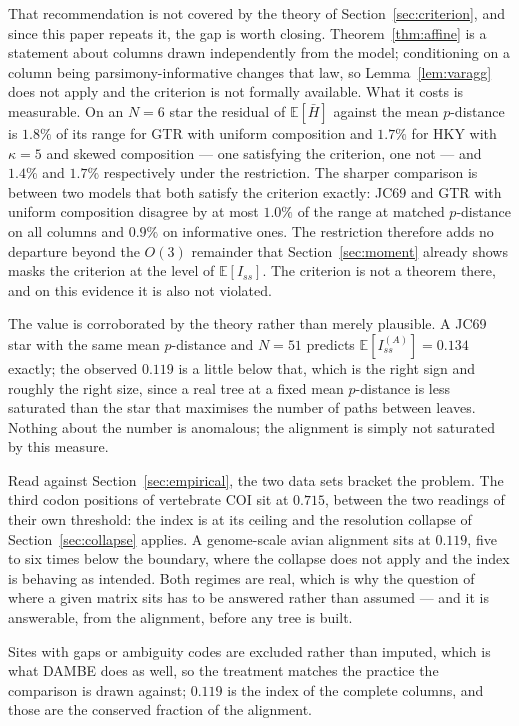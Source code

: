 \documentclass[11pt]{article}
\newcommand{\Iss}{I_{ss}}
\newcommand{\Hbar}{\bar H}
\newcommand{\E}{\mathbb{E}}
\theoremstyle{definition}
\theoremstyle{remark}
\begin{document}
That recommendation is not covered by the theory of
Section~\ref{sec:criterion}, and since this paper repeats it, the gap is
worth closing. Theorem~\ref{thm:affine} is a statement about columns drawn
independently from the model; conditioning on a column being
parsimony-informative changes that law, so Lemma~\ref{lem:varagg} does not
apply and the criterion is not formally available. What it costs is
measurable. On an $N=6$ star the residual of $\E[\Hbar]$ against the mean
$p$-distance is $1.8\%$ of its range for GTR with uniform composition and
$1.7\%$ for HKY with $\kappa=5$ and skewed composition --- one satisfying the
criterion, one not --- and $1.4\%$ and $1.7\%$ respectively under the
restriction. The sharper comparison is between two models that both satisfy
the criterion exactly: JC69 and GTR with uniform composition disagree by at
most $1.0\%$ of the range at matched $p$-distance on all columns and $0.9\%$
on informative ones. The restriction therefore adds no departure beyond the
$O(3)$ remainder that Section~\ref{sec:moment} already shows masks the
criterion at the level of $\E[\Iss]$. The criterion is not a theorem there,
and on this evidence it is also not violated.

The value is corroborated by the theory rather than merely plausible. A JC69
star with the same mean $p$-distance and $N=51$ predicts
$\E[\Iss^{(A)}]=0.134$ exactly; the observed $0.119$ is a little below that,
which is the right sign and roughly the right size, since a real tree at a
fixed mean $p$-distance is less saturated than the star that maximises the
number of paths between leaves. Nothing about the number is anomalous; the
alignment is simply not saturated by this measure.

Read against Section~\ref{sec:empirical}, the two data sets bracket the
problem. The third codon positions of vertebrate COI sit at $0.715$, between
the two readings of their own threshold: the index is at its ceiling and the
resolution collapse of Section~\ref{sec:collapse} applies. A genome-scale avian alignment sits at
$0.119$, five to six times below the boundary, where the collapse does
not apply and the index is behaving as intended. Both regimes are real, which
is why the question of where a given matrix sits has to be answered rather
than assumed --- and it is answerable, from the alignment, before any tree is
built.

Sites with gaps or ambiguity codes are excluded rather than imputed, which is
what DAMBE does as well, so the treatment matches the practice the comparison
is drawn against; $0.119$ is the index of the complete columns, and those are
the conserved fraction of the alignment.
\end{document}
